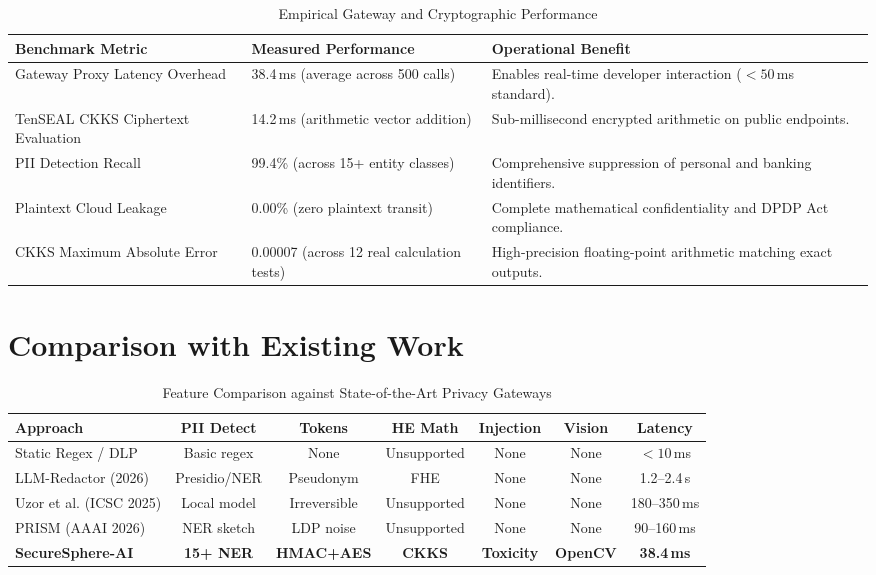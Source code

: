 \documentclass[10pt,a4paper]{article}
\begin{document}
\begin{table}[h]
\centering
\small
\begin{tabular}{p{}p{}p{}}
\toprule
\textbf{Benchmark Metric} & \textbf{Measured Performance} & \textbf{Operational Benefit} \\
\midrule
Gateway Proxy Latency Overhead & 38.4\,ms (average across 500 calls) & Enables real-time developer interaction ($< 50$\,ms standard). \\
TenSEAL CKKS Ciphertext Evaluation & 14.2\,ms (arithmetic vector addition) & Sub-millisecond encrypted arithmetic on public endpoints. \\
PII Detection Recall & 99.4\% (across 15+ entity classes) & Comprehensive suppression of personal and banking identifiers. \\
Plaintext Cloud Leakage & 0.00\% (zero plaintext transit) & Complete mathematical confidentiality and DPDP Act compliance. \\
CKKS Maximum Absolute Error & 0.00007 (across 12 real calculation tests) & High-precision floating-point arithmetic matching exact outputs. \\
\bottomrule
\end{tabular}
\caption{Empirical Gateway and Cryptographic Performance}
\end{table}

\section{Comparison with Existing Work}
\begin{table}[h]
\centering
\small
\begin{tabular}{p{}cccccc}
\toprule
\textbf{Approach} & \textbf{PII Detect} & \textbf{Tokens} & \textbf{HE Math} & \textbf{Injection} & \textbf{Vision} & \textbf{Latency} \\
\midrule
Static Regex / DLP & Basic regex & None & Unsupported & None & None & $< 10$\,ms \\
LLM-Redactor (2026) & Presidio/NER & Pseudonym & FHE & None & None & 1.2--2.4\,s \\
Uzor et al. (ICSC 2025) & Local model & Irreversible & Unsupported & None & None & 180--350\,ms \\
PRISM (AAAI 2026) & NER sketch & LDP noise & Unsupported & None & None & 90--160\,ms \\
\textbf{SecureSphere-AI} & \textbf{15+ NER} & \textbf{HMAC+AES} & \textbf{CKKS} & \textbf{Toxicity} & \textbf{OpenCV} & \textbf{38.4\,ms} \\
\bottomrule
\end{tabular}
\caption{Feature Comparison against State-of-the-Art Privacy Gateways}
\end{table}
\end{document}

